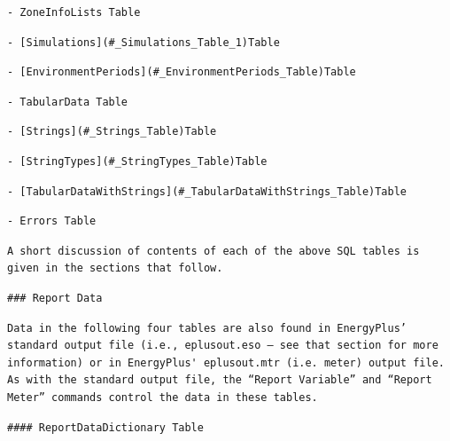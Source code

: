 \begin{lstlisting}
- ZoneInfoLists Table
\end{lstlisting}

\begin{lstlisting}
- [Simulations](#_Simulations_Table_1)Table
\end{lstlisting}

\begin{lstlisting}
- [EnvironmentPeriods](#_EnvironmentPeriods_Table)Table
\end{lstlisting}

\begin{lstlisting}
- TabularData Table
\end{lstlisting}

\begin{lstlisting}
- [Strings](#_Strings_Table)Table
\end{lstlisting}

\begin{lstlisting}
- [StringTypes](#_StringTypes_Table)Table
\end{lstlisting}

\begin{lstlisting}
- [TabularDataWithStrings](#_TabularDataWithStrings_Table)Table
\end{lstlisting}

\begin{lstlisting}
- Errors Table
\end{lstlisting}

\begin{lstlisting}
A short discussion of contents of each of the above SQL tables is given in the sections that follow.
\end{lstlisting}

\begin{lstlisting}
### Report Data
\end{lstlisting}

\begin{lstlisting}
Data in the following four tables are also found in EnergyPlus’ standard output file (i.e., eplusout.eso – see that section for more information) or in EnergyPlus' eplusout.mtr (i.e. meter) output file. As with the standard output file, the “Report Variable” and “Report Meter” commands control the data in these tables.
\end{lstlisting}

\begin{lstlisting}
#### ReportDataDictionary Table
\end{lstlisting}

